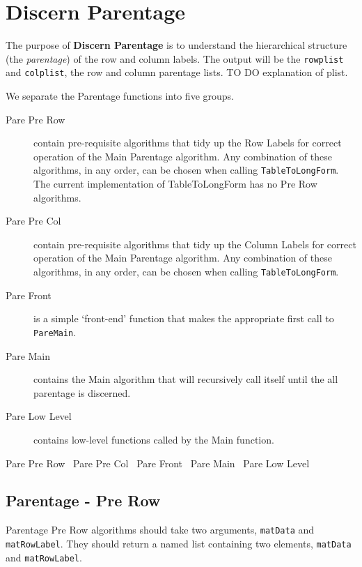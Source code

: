 \documentclass[a4paper]{article}
\begin{document}
\section{Discern Parentage}
\label{sec:parentage}
The purpose of \textbf{Discern Parentage} is to understand the
hierarchical structure (the \emph{parentage}) of the row and column
labels. The output will be the \verb|rowplist| and \verb|colplist|,
the row and column parentage lists. TO DO explanation of plist.

We separate the Parentage functions into five groups.
\begin{description}
\item[Pare Pre Row] contain pre-requisite algorithms that tidy up the
  Row Labels for correct operation of the Main Parentage
  algorithm. Any combination of these algorithms, in any order, can be
  chosen when calling \verb|TableToLongForm|. The current
  implementation of TableToLongForm has no Pre Row algorithms.
\item[Pare Pre Col] contain pre-requisite algorithms that tidy up the
  Column Labels for correct operation of the Main Parentage
  algorithm. Any combination of these algorithms, in any order, can be
  chosen when calling \verb|TableToLongForm|.
\item[Pare Front] is a simple `front-end' function that makes the
  appropriate first call to \verb|PareMain|.
\item[Pare Main] contains the Main algorithm that will recursively
  call itself until the all parentage is discerned.
\item[Pare Low Level] contains low-level functions called by the Main
  function.
\end{description}

\nwenddocs{}\endmoddef
\LA{}Pare Pre Row~{\nwtagstyle{}}\RA{}
\LA{}Pare Pre Col~{\nwtagstyle{}}\RA{}
\LA{}Pare Front~{\nwtagstyle{}}\RA{}
\LA{}Pare Main~{\nwtagstyle{}}\RA{}
\LA{}Pare Low Level~{\nwtagstyle{}}\RA{}
\nwendcode{}\nwdocspar

\subsection{Parentage - Pre Row}
Parentage Pre Row algorithms should take two arguments, \verb|matData|
and \verb|matRowLabel|. They should return a named list containing two
elements, \verb|matData| and \verb|matRowLabel|.
\end{document}
